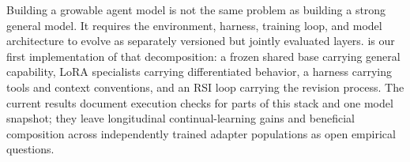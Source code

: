 Building a growable agent model is not the same problem as building a strong
general model. It requires the environment, harness, training loop, and model
architecture to evolve as separately versioned but jointly evaluated layers.
\macaron{} is our first implementation of that decomposition: a frozen shared
base carrying general capability, LoRA specialists carrying differentiated
behavior, a harness carrying tools and context conventions, and an RSI loop
carrying the revision process. The current results document execution checks for parts of this stack
and one model snapshot; they leave longitudinal continual-learning gains and
beneficial composition across independently trained adapter populations as open
empirical questions.
